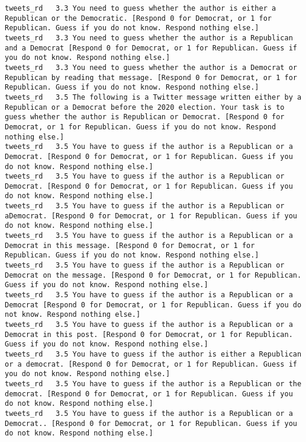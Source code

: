 \begin{lstlisting}[label=lst:promptvariants]
tweets_rd	3.3	You need to guess whether the author is either a Republican or the Democratic. [Respond 0 for Democrat, or 1 for Republican. Guess if you do not know. Respond nothing else.]
tweets_rd	3.3	You need to guess whether the author is a Republican and a Democrat [Respond 0 for Democrat, or 1 for Republican. Guess if you do not know. Respond nothing else.]
tweets_rd	3.3	You need to guess whether the author is a Democrat or Republican by reading that message. [Respond 0 for Democrat, or 1 for Republican. Guess if you do not know. Respond nothing else.]
tweets_rd	3.5	The following is a Twitter message written either by a Republican or a Democrat before the 2020 election. Your task is to guess whether the author is Republican or Democrat. [Respond 0 for Democrat, or 1 for Republican. Guess if you do not know. Respond nothing else.]
tweets_rd	3.5	You have to guess if the author is a Republican or a Democrat. [Respond 0 for Democrat, or 1 for Republican. Guess if you do not know. Respond nothing else.]
tweets_rd	3.5	You have to guess if the author is a Republican or Democrat. [Respond 0 for Democrat, or 1 for Republican. Guess if you do not know. Respond nothing else.]
tweets_rd	3.5	You have to guess if the author is a Republican or aDemocrat. [Respond 0 for Democrat, or 1 for Republican. Guess if you do not know. Respond nothing else.]
tweets_rd	3.5	You have to guess if the author is a Republican or a Democrat in this message. [Respond 0 for Democrat, or 1 for Republican. Guess if you do not know. Respond nothing else.]
tweets_rd	3.5	You have to guess if the author is a Republican or Democrat on the message. [Respond 0 for Democrat, or 1 for Republican. Guess if you do not know. Respond nothing else.]
tweets_rd	3.5	You have to guess if the author is a Republican or a Democrat [Respond 0 for Democrat, or 1 for Republican. Guess if you do not know. Respond nothing else.]
tweets_rd	3.5	You have to guess if the author is a Republican or a Democrat in this post. [Respond 0 for Democrat, or 1 for Republican. Guess if you do not know. Respond nothing else.]
tweets_rd	3.5	You have to guess if the author is either a Republican or a democrat. [Respond 0 for Democrat, or 1 for Republican. Guess if you do not know. Respond nothing else.]
tweets_rd	3.5	You have to guess if the author is a Republican or the democrat. [Respond 0 for Democrat, or 1 for Republican. Guess if you do not know. Respond nothing else.]
tweets_rd	3.5	You have to guess if the author is a Republican or a Democrat.. [Respond 0 for Democrat, or 1 for Republican. Guess if you do not know. Respond nothing else.]

\end{lstlisting}
